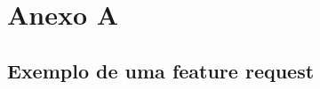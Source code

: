 % 
% 
% 
% 

\section{Anexo A} \label{sec:anexoa}

\subsection{Exemplo de uma feature request}\label{sec:anexoa:featurereq}

